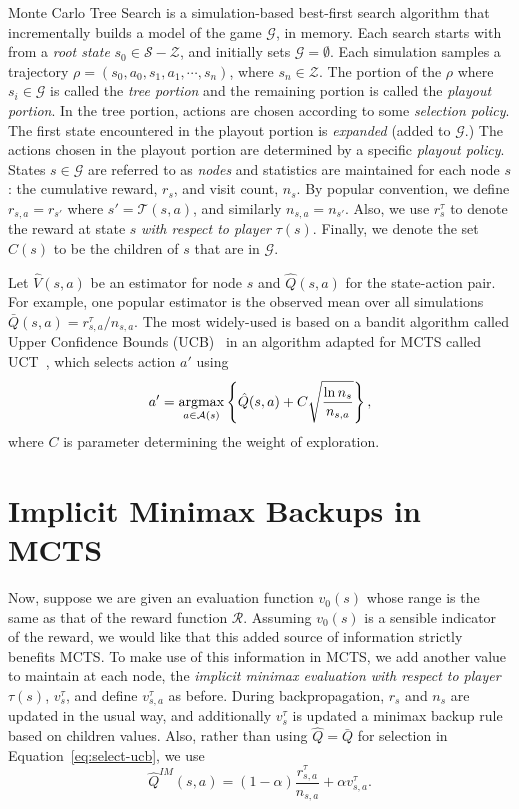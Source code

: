 \documentclass[letterpaper]{article}
\newcommand{\argmax}{\operatornamewithlimits{argmax}}
\newcommand{\bQ}{\bar{Q}}
\newcommand{\cA}{\mathcal{A}}
\newcommand{\cG}{\mathcal{G}}
\newcommand{\cR}{\mathcal{R}}
\newcommand{\cS}{\mathcal{S}}
\newcommand{\cT}{\mathcal{T}}
\newcommand{\cZ}{\mathcal{Z}}
\newcommand{\hQ}{\hat{Q}}
\newcommand{\hV}{\hat{V}}
\begin{document}
Monte Carlo Tree Search is a simulation-based best-first search algorithm that incrementally builds a model of the game 
$\cG$, in memory. Each search starts with from a {\it root state} $s_0 \in \cS - \cZ$, and initially sets $\cG = \emptyset$. 
Each simulation samples a trajectory $\rho = (s_0, a_0, s_1, a_1, \cdots, s_n)$, where $s_n \in \cZ$. 
The portion of the $\rho$ where $s_i \in \cG$ is called the {\it tree portion} and the remaining portion is
called the {\it playout portion}. In the tree portion, actions are chosen according to some {\it selection policy}. 
The first state encountered in the playout portion is {\it expanded} (added to $\cG$.) 
The actions chosen in the playout portion are determined by a specific {\it playout policy}. 
States $s \in \cG$ are referred to as {\it nodes} and statistics are  
maintained for each node $s$: the cumulative reward, $r_s$, and visit count, $n_s$. 
By popular convention, we define $r_{s,a} = r_{s'}$ where $s' = \cT(s,a)$, and similarly $n_{s,a} = n_{s'}$. 
Also, we use $r^{\tau}_s$ to denote the reward at state $s$ {\it with respect to player} $\tau(s)$. 
Finally, we denote  the set $C(s)$ to be the children of $s$ that are in $\cG$. 

Let $\hV(s,a)$ be an estimator for node $s$ and $\hQ(s,a)$ for the state-action pair. 
For example, one popular estimator is the observed mean over all simulations 
$\bQ(s,a) = r^{\tau}_{s,a} / n_{s,a}$. 
The most widely-used is based on a bandit algorithm called Upper Confidence Bounds (UCB)~\cite{Auer02Finite} in an algorithm adapted 
for MCTS called UCT~\cite{Kocsis06Bandit}, which selects action $a'$ using
\begin{equation}
\label{eq:select-ucb}
a' = \argmax_{a \in \cA(s)} \left\{ \hQ(s,a) + C \sqrt{\frac{\ln n_s}{n_{s,a}}} \right\}, 
\end{equation}
where $C$ is parameter determining the weight of exploration. 

\section{Implicit Minimax Backups in MCTS}

Now, suppose we are given an evaluation function $v_0(s)$ whose range is the same as that of the reward function $\cR$. 
Assuming $v_0(s)$ is a sensible indicator of the reward, we would like that this added source of information
strictly benefits MCTS. 
To make use of this information in MCTS, we add another value to maintain at each node, the 
{\it implicit minimax evaluation with respect to player} $\tau(s)$, $v^{\tau}_s$, and define $v^{\tau}_{s,a}$ as before. 
During backpropagation, $r_s$ and $n_s$ are updated in the usual way, and additionally $v^{\tau}_s$ is updated a minimax backup 
rule based on children values. Also, rather than using $\hQ = \bQ$ for selection in Equation~\ref{eq:select-ucb}, we use
\begin{equation}
\label{eq:imq}
\hQ^{\mathit{IM}}(s,a) = (1-\alpha) \frac{r^{\tau}_{s,a}}{n_{s,a}} + \alpha v^{\tau}_{s,a}.
\end{equation}
\end{document}
